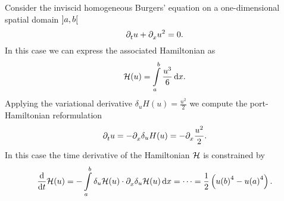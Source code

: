\begin{example}
\end{example}

\begin{example}\label{ex:burgers}
    Consider the inviscid homogeneous Burgers' equation on a one-dimensional spatial domain $\interval[open]{a}{b}$
    \begin{equation*}
        \pd[t]{} u + \pd[x]{} u^2 = 0.
    \end{equation*}
    In this case we can express the associated Hamiltonian as
    \begin{equation*}
        \mcl{H}(u) = \int\limits_a^b \frac{u^3}{6} \dif x.
    \end{equation*}
    Applying the variational derivative $\delta_u H(u) = \frac{u^2}{2}$ we compute the port-Hamiltonian reformulation
    \begin{equation*}
        \pd[t]{} u = - \pd{} \delta_u H(u) = -\pd{} \frac{u^2}{2}.
    \end{equation*}
    In this case the time derivative of the Hamiltonian $\mcl{H}$ is constrained by
    \begin{equation*}
        \frac{\dif}{\dif t} \mcl{H}(u) = - \int\limits_a^b \delta_u \mcl{H}(u) \cdot \pd{} \delta_u \mcl{H}(u) \dif x = \cdots = \frac{1}{2} \left( {u(b)}^4 - {u(a)}^4 \right).
    \end{equation*}

\end{example}

